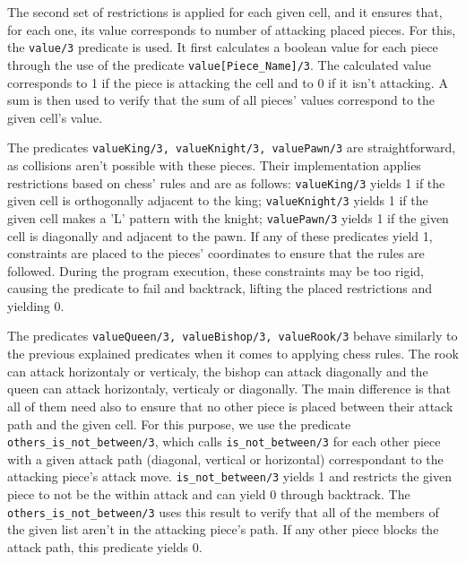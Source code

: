 \documentclass[runningheads]{llncs}
\newcommand{\inlinecode}[1]{\texttt{#1}}
\begin{document}
The second set of restrictions is applied for each given cell, and it ensures that, for each
one, its value corresponds to number of attacking placed pieces. For this, the \inlinecode{value/3}
predicate is used. It first calculates a boolean value for each piece through the use of the predicate
\inlinecode{value[Piece\_Name]/3}. The calculated value corresponds to 1 if the piece is attacking
the cell and to 0 if it isn't attacking. A sum is then used to verify that the sum of all pieces' values
correspond to the given cell's value.

The predicates \inlinecode{valueKing/3, valueKnight/3, valuePawn/3} are straightforward, as
collisions aren't possible with these pieces. Their implementation applies restrictions based
on chess' rules and are as follows: \inlinecode{valueKing/3} yields 1 if the given cell is orthogonally adjacent to
the king; \inlinecode{valueKnight/3} yields 1 if the given cell makes a 'L' pattern
with the knight; \inlinecode{valuePawn/3} yields 1 if the given cell is diagonally and adjacent to
the pawn. If any of these predicates yield 1, constraints are placed to the pieces' coordinates
to ensure that the rules are followed. During the program execution, these constraints may
be too rigid, causing the predicate to fail and backtrack, lifting the placed restrictions and
yielding 0.

The predicates \inlinecode{valueQueen/3, valueBishop/3, valueRook/3} behave similarly to
the previous explained predicates when it comes to applying chess rules. The rook can attack
horizontaly or verticaly, the bishop can attack diagonally and the queen can attack horizontaly, verticaly
or diagonally. The main difference is that all of them need also to ensure that no other piece
is placed between their attack path and the given cell.
For this purpose, we use the predicate \inlinecode{others\_is\_not\_between/3}, which calls
\inlinecode{is\_not\_between/3} for each other piece with a given attack path (diagonal, vertical or horizontal)
correspondant to the attacking piece's attack move. \inlinecode{is\_not\_between/3} yields 1 and
restricts the given piece to not be the within attack and can yield 0 through backtrack.
The \inlinecode{others\_is\_not\_between/3} uses this result to verify that all of the members of
the given list aren't in the attacking piece's path. If any other piece blocks the attack path,
this predicate yields 0.
\end{document}
